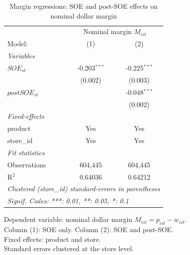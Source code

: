 
\begin{table}[htbp]
   \caption{\label{tab:margin_reg} Margin regressions: SOE and post-SOE effects on nominal dollar margin}
   \centering
   \begin{tabular}{lcc}
      \tabularnewline \midrule \midrule
       & \multicolumn{2}{c}{Nominal margin $M_{ist}$} \\ 
      Model:         & (1)            & (2)\\  
      \midrule
      \emph{Variables}\\
      $SOE_{st}$     & -0.203$^{***}$ & -0.225$^{***}$\\   
                     & (0.002)        & (0.003)\\   
      $postSOE_{st}$ &                & -0.048$^{***}$\\   
                     &                & (0.002)\\   
      \midrule
      \emph{Fixed-effects}\\
      product        & Yes            & Yes\\  
      store\_id      & Yes            & Yes\\  
      \midrule
      \emph{Fit statistics}\\
      Observations   & 604,445        & 604,445\\  
      R$^2$          & 0.64036        & 0.64212\\  
      \midrule \midrule
      \multicolumn{3}{l}{\emph{Clustered (store\_id) standard-errors in parentheses}}\\
      \multicolumn{3}{l}{\emph{Signif. Codes: ***: 0.01, **: 0.05, *: 0.1}}\\
   \end{tabular}
   
   \par \raggedright 
   Dependent variable: nominal dollar margin $M_{ist} = p_{ist} - w_{ist}$.\\
   Column (1): SOE only. Column (2): SOE and post-SOE.\\
   Fixed effects: product and store.\\
   Standard errors clustered at the store level.
\end{table}


